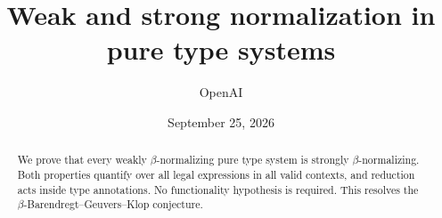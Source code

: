 \documentclass[11pt]{article}
\title{Weak and strong normalization in pure type systems}
\author{OpenAI}
\date{September 25, 2026}
\theoremstyle{definition}
\begin{document}
\maketitle
\begin{abstract}
We prove that every weakly $\beta$-normalizing pure type system is strongly
$\beta$-normalizing. Both properties quantify over all legal expressions
in all valid contexts, and reduction acts inside type annotations.
No functionality hypothesis is required. This resolves the
$\beta$-Barendregt--Geuvers--Klop conjecture.
\end{abstract}
\setcounter{tocdepth}{1}
\tableofcontents
\clearpage









{\small

}
\end{document}
